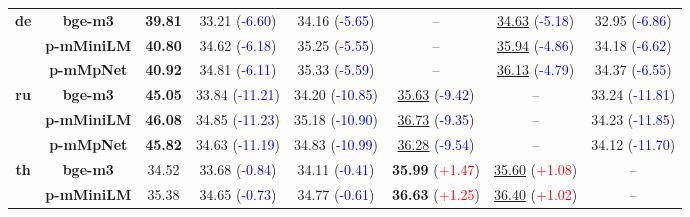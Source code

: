 \begin{table*}[!ht]
{\begin{tabular}{cc|>{\columncolor{gray!15}}c|ccccc}
\multirow{3}{*}{\textbf{de}}
& \textbf{bge-m3}
  & \textbf{39.81}
  & 33.21 {\scriptsize(\textcolor{blue}{-6.60})}
  & 34.16 {\scriptsize(\textcolor{blue}{-5.65})}
  & --
  & \underline{34.63} {\scriptsize(\textcolor{blue}{-5.18})}
  & 32.95 {\scriptsize(\textcolor{blue}{-6.86})} \\
& \textbf{p-mMiniLM}
  & \textbf{40.80}
  & 34.62 {\scriptsize(\textcolor{blue}{-6.18})}
  & 35.25 {\scriptsize(\textcolor{blue}{-5.55})}
  & --
  & \underline{35.94} {\scriptsize(\textcolor{blue}{-4.86})}
  & 34.18 {\scriptsize(\textcolor{blue}{-6.62})} \\
& \textbf{p-mMpNet}
  & \textbf{40.92}
  & 34.81 {\scriptsize(\textcolor{blue}{-6.11})}
  & 35.33 {\scriptsize(\textcolor{blue}{-5.59})}
  & --
  & \underline{36.13} {\scriptsize(\textcolor{blue}{-4.79})}
  & 34.37 {\scriptsize(\textcolor{blue}{-6.55})} \\
\midrule
\multirow{3}{*}{\textbf{ru}}
& \textbf{bge-m3}
  & \textbf{45.05}
  & 33.84 {\scriptsize(\textcolor{blue}{-11.21})}
  & 34.20 {\scriptsize(\textcolor{blue}{-10.85})}
  & \underline{35.63} {\scriptsize(\textcolor{blue}{-9.42})}
  & --
  & 33.24 {\scriptsize(\textcolor{blue}{-11.81})} \\
& \textbf{p-mMiniLM}
  & \textbf{46.08}
  & 34.85 {\scriptsize(\textcolor{blue}{-11.23})}
  & 35.18 {\scriptsize(\textcolor{blue}{-10.90})}
  & \underline{36.73} {\scriptsize(\textcolor{blue}{-9.35})}
  & --
  & 34.23 {\scriptsize(\textcolor{blue}{-11.85})} \\
& \textbf{p-mMpNet}
  & \textbf{45.82}
  & 34.63 {\scriptsize(\textcolor{blue}{-11.19})}
  & 34.83 {\scriptsize(\textcolor{blue}{-10.99})}
  & \underline{36.28} {\scriptsize(\textcolor{blue}{-9.54})}
  & --
  & 34.12 {\scriptsize(\textcolor{blue}{-11.70})} \\
\midrule
\multirow{3}{*}{\textbf{th}}
& \textbf{bge-m3}
  & 34.52
  & 33.68 {\scriptsize(\textcolor{blue}{-0.84})}
  & 34.11 {\scriptsize(\textcolor{blue}{-0.41})}
  & \textbf{35.99} {\scriptsize(\textcolor{red}{+1.47})}
  & \underline{35.60} {\scriptsize(\textcolor{red}{+1.08})}
  & -- \\
& \textbf{p-mMiniLM}
  & 35.38
  & 34.65 {\scriptsize(\textcolor{blue}{-0.73})}
  & 34.77 {\scriptsize(\textcolor{blue}{-0.61})}
  & \textbf{36.63} {\scriptsize(\textcolor{red}{+1.25})}
  & \underline{36.40} {\scriptsize(\textcolor{red}{+1.02})}
  & -- \\

\end{tabular}}
\end{table*}
